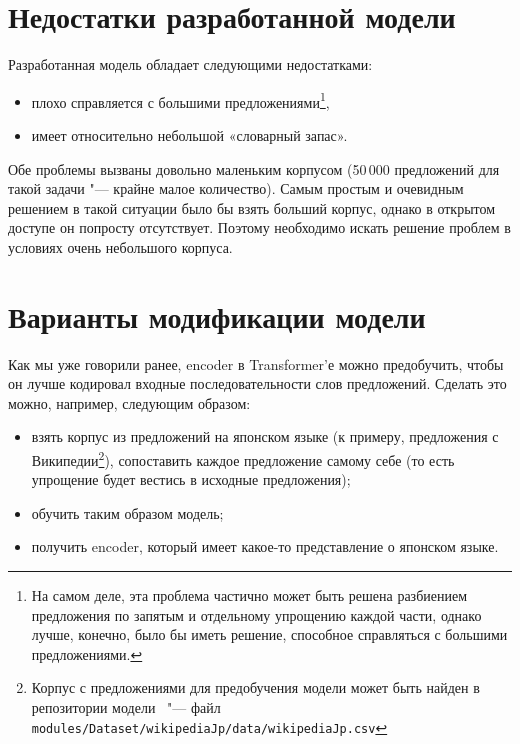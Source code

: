 


\section{Недостатки разработанной модели}


Разработанная модель обладает следующими недостатками:
\begin{itemize}%
  \item плохо справляется с большими предложениями\footnote{На самом деле, эта проблема частично может быть решена разбиением предложения по запятым и отдельному упрощению каждой части, однако лучше, конечно, было бы иметь решение, способное справляться с большими предложениями.},
  \item имеет относительно небольшой «словарный запас».
\end{itemize}

Обе проблемы вызваны довольно маленьким корпусом (50\,000 предложений для такой задачи "--- крайне малое количество).
Самым простым и очевидным решением в такой ситуации было бы взять больший корпус, однако в открытом доступе он попросту отсутствует.
Поэтому необходимо искать решение проблем в условиях очень небольшого корпуса.


\section{Варианты модификации модели}


Как мы уже говорили ранее, encoder в Transformer'е можно предобучить, чтобы он лучше кодировал входные последовательности слов предложений.
Сделать это можно, например, следующим образом:
\begin{itemize}%
  \item взять корпус из предложений на японском языке (к примеру, предложения с Википедии\footnote{Корпус с предложениями для предобучения модели может быть найден в репозитории модели~\cite{ServerGithub} "--- файл \texttt{modules/Dataset/wikipediaJp/data/wikipediaJp.csv}}), сопоставить каждое предложение самому себе (то есть упрощение будет вестись в исходные предложения);
  \item обучить таким образом модель;
  \item получить encoder, который имеет какое-то представление о японском языке.
\end{itemize}

